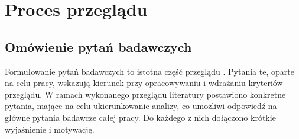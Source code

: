 \section{Proces przeglądu}\label{chapter:proces_przegladu}

\subsection{Omówienie pytań badawczych}\label{chapter:omowanie_pytan_badawczych}

Formułowanie pytań badawczych to istotna część przeglądu \cite{KitchenhamProceduresSR}. 
Pytania te, oparte na celu pracy, wskazują kierunek przy opracowywaniu i wdrażaniu kryteriów przeglądu. 
W ramach wykonanego przeglądu literatury postawiono konkretne pytania, mające na celu ukierunkowanie analizy, 
co umożliwi odpowiedź na główne pytania badawcze całej pracy. 
Do każdego z nich dołączono krótkie wyjaśnienie i motywację.
 
